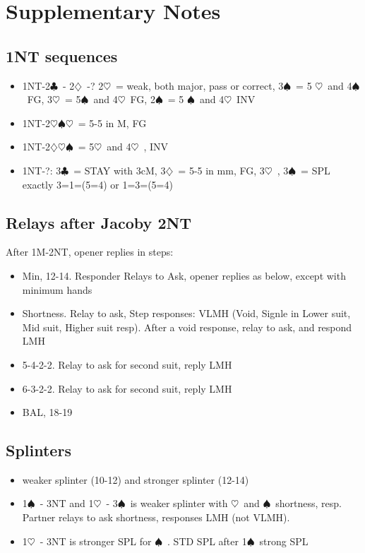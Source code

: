 \documentclass{article}
\newcommand\C{\ensuremath{\clubsuit}}
\newcommand\D{\ensuremath{\diamondsuit}}
\renewcommand\H{\ensuremath{\heartsuit}}
\renewcommand\S{\ensuremath{\spadesuit}}
\begin{document}
\section{Supplementary Notes}
\begin{multicols}{2}
  \subsection{1NT sequences}
  \label{1ntfollowups}
  \begin{itemize}
    \item 1NT-2\C\ - 2\D\ -?  2\H\ = weak, both major, pass or correct, 3\S\ = 5 \H\ and 4\S\ FG, 3\H\ = 5\S\ and 4\H\ FG, 2\S\ = 5 \S\ and 4\H\ INV
    \item 1NT-2\H{}\S{}\H\ = 5-5 in M, FG
    \item 1NT-2\D{}\H{}\S\ = 5\H\ and 4\H\ , INV
    \item 1NT-?: 3\C\ = STAY with 3cM, 3\D\ = 5-5 in mm, FG, 3\H\ , 3\S\ = SPL exactly 3=1=(5=4) or 1=3=(5=4)
  \end{itemize}



  \subsection{Relays after Jacoby 2NT}
  \label{j2nt}
  After 1M-2NT, opener replies in steps:
  \begin{itemize}
    \item Min, 12-14. Responder Relays to Ask, opener replies as below, except with minimum hands
    \item Shortness. Relay to ask, Step responses:  VLMH (Void, Signle in Lower suit, Mid suit, Higher suit resp). After a void response, relay to ask, and respond LMH
    \item 5-4-2-2. Relay to ask for second suit, reply LMH
    \item 6-3-2-2. Relay to ask for second suit, reply LMH
    \item BAL, 18-19
  \end{itemize}
  \subsection{Splinters}
  \label{spl}
   \begin{itemize}
     \item weaker splinter (10-12) and stronger splinter (12-14)
     \item 1\S\ - 3NT and 1\H\ - 3\S\ is weaker splinter with \H\ and \S\ shortness, resp. Partner relays to ask shortness, responses LMH (not VLMH).
     \item 1\H\ - 3NT is stronger SPL for \S\ . STD SPL after 1\S\ strong SPL  
   \end{itemize}

\end{multicols}
\end{document}
